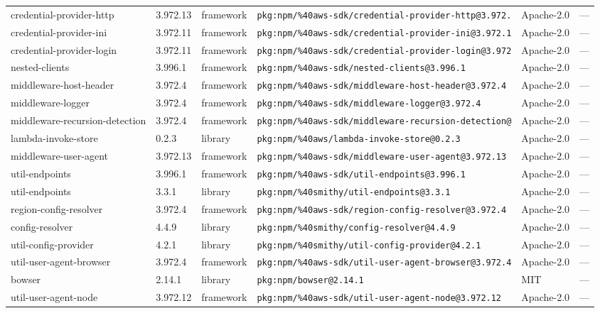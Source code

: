 \documentclass[11pt]{article}
\begin{document}
\begin{longtable}{|l|l|l|p{2.2cm}|l|p{4cm}|}
credential-provider-http & 3.972.13 & framework & \texttt{pkg:npm/\%40aws-sdk/credential-provider-http@3.972.} & Apache-2.0 & — \\
credential-provider-ini & 3.972.11 & framework & \texttt{pkg:npm/\%40aws-sdk/credential-provider-ini@3.972.1} & Apache-2.0 & — \\
credential-provider-login & 3.972.11 & framework & \texttt{pkg:npm/\%40aws-sdk/credential-provider-login@3.972} & Apache-2.0 & — \\
nested-clients & 3.996.1 & framework & \texttt{pkg:npm/\%40aws-sdk/nested-clients@3.996.1} & Apache-2.0 & — \\
middleware-host-header & 3.972.4 & framework & \texttt{pkg:npm/\%40aws-sdk/middleware-host-header@3.972.4} & Apache-2.0 & — \\
middleware-logger & 3.972.4 & framework & \texttt{pkg:npm/\%40aws-sdk/middleware-logger@3.972.4} & Apache-2.0 & — \\
middleware-recursion-detection & 3.972.4 & framework & \texttt{pkg:npm/\%40aws-sdk/middleware-recursion-detection@} & Apache-2.0 & — \\
lambda-invoke-store & 0.2.3 & library & \texttt{pkg:npm/\%40aws/lambda-invoke-store@0.2.3} & Apache-2.0 & — \\
middleware-user-agent & 3.972.13 & framework & \texttt{pkg:npm/\%40aws-sdk/middleware-user-agent@3.972.13} & Apache-2.0 & — \\
util-endpoints & 3.996.1 & framework & \texttt{pkg:npm/\%40aws-sdk/util-endpoints@3.996.1} & Apache-2.0 & — \\
util-endpoints & 3.3.1 & library & \texttt{pkg:npm/\%40smithy/util-endpoints@3.3.1} & Apache-2.0 & — \\
region-config-resolver & 3.972.4 & framework & \texttt{pkg:npm/\%40aws-sdk/region-config-resolver@3.972.4} & Apache-2.0 & — \\
config-resolver & 4.4.9 & library & \texttt{pkg:npm/\%40smithy/config-resolver@4.4.9} & Apache-2.0 & — \\
util-config-provider & 4.2.1 & library & \texttt{pkg:npm/\%40smithy/util-config-provider@4.2.1} & Apache-2.0 & — \\
util-user-agent-browser & 3.972.4 & framework & \texttt{pkg:npm/\%40aws-sdk/util-user-agent-browser@3.972.4} & Apache-2.0 & — \\
bowser & 2.14.1 & library & \texttt{pkg:npm/bowser@2.14.1} & MIT & — \\
util-user-agent-node & 3.972.12 & framework & \texttt{pkg:npm/\%40aws-sdk/util-user-agent-node@3.972.12} & Apache-2.0 & — \\

\end{longtable}
\end{document}
